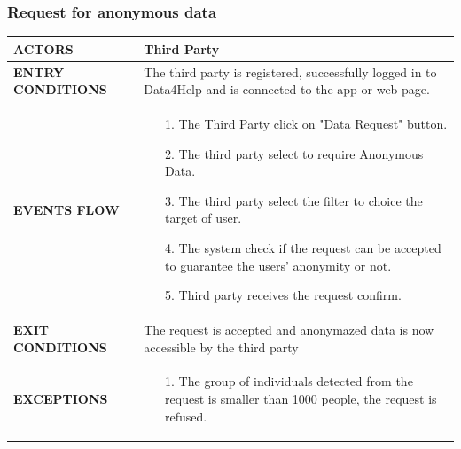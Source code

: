 \documentclass[a4paper]{article}
\begin{document}
\subsubsection{Request for anonymous data}
\begin{center}
    \begin{tabular}{l || p{8cm} ||}
        \bf{ACTORS} & Third Party \\ \hline
        \bf{ENTRY CONDITIONS} & The third party is registered, successfully logged in to Data4Help and is connected to the app or web page.\\ \hline
        \bf{EVENTS FLOW} & \begin{itemize}[noitemsep, topsep=0cm, leftmargin=*] \vspace{-0.2cm}
            \item[1.] The Third Party click on "Data Request" button.
            \item[2.] The third party select to require Anonymous Data.
            \item[3.] The third party select the filter to choice the target of user.
            \item[4.] The system check if the request can be accepted to guarantee the users' anonymity or not.
            \item[5.] Third party receives the request confirm.
        \end{itemize}
        \\ \hline
        \bf{EXIT CONDITIONS} & The request is accepted and anonymazed data is now accessible by the third party\\ \hline
        \bf{EXCEPTIONS} &\begin{itemize}[noitemsep, topsep=0cm, leftmargin=*] \vspace{-0.2cm}
            \item[1.] The group of individuals detected from the request is smaller than 1000 people, the request is refused.
        \end{itemize}
        \\ \hline \hline
    \end{tabular}
\end{center}

\vspace{1cm}
\end{document}

